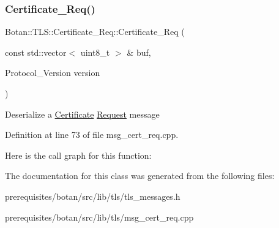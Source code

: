\mbox{\label{class_botan_1_1_t_l_s_1_1_certificate___req_ad633ad08f5ccf7273534c3d952e32b8a}} 
\subsubsection{\texorpdfstring{Certificate\+\_\+\+Req()}{Certificate\_Req()}\hspace{0.1cm}{\footnotesize\ttfamily [2/2]}}
{\footnotesize\ttfamily Botan\+::\+T\+L\+S\+::\+Certificate\+\_\+\+Req\+::\+Certificate\+\_\+\+Req (\begin{DoxyParamCaption}\item[{const std\+::vector$<$ uint8\+\_\+t $>$ \&}]{buf,  }\item[{Protocol\+\_\+\+Version}]{version }\end{DoxyParamCaption})}

Deserialize a \mbox{\hyperlink{class_botan_1_1_t_l_s_1_1_certificate}{Certificate}} \mbox{\hyperlink{struct_request}{Request}} message 

Definition at line 73 of file msg\+\_\+cert\+\_\+req.\+cpp.

Here is the call graph for this function\+:


The documentation for this class was generated from the following files\+:\begin{DoxyCompactItemize}
\item 
prerequisites/botan/src/lib/tls/tls\+\_\+messages.\+h\item 
prerequisites/botan/src/lib/tls/msg\+\_\+cert\+\_\+req.\+cpp\end{DoxyCompactItemize}
